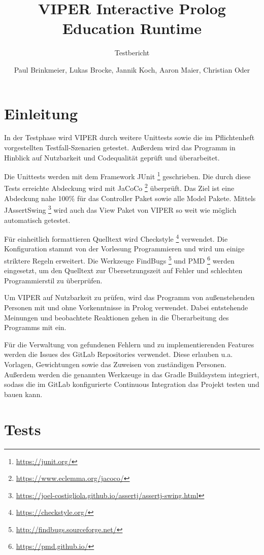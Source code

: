 \documentclass[parskip=full,11pt,twoside]{scrartcl}
\title{VIPER Interactive Prolog Education Runtime}
\subtitle{Testbericht}
\author{Paul Brinkmeier, Lukas Brocke, Jannik Koch, Aaron Maier, Christian Oder}
\date{}
\begin{document}
\maketitle

\tableofcontents

\section{Einleitung}
\setcounter{page}{1}

In der Testphase wird VIPER durch weitere Unittests sowie die im Pflichtenheft vorgestellten Testfall-Szenarien getestet. Außerdem wird das Programm in Hinblick auf Nutzbarkeit und Codequalität geprüft und überarbeitet.

Die Unittests werden mit dem Framework JUnit \footnote{\url{https://junit.org/}} geschrieben. Die durch diese Tests erreichte Abdeckung wird mit JaCoCo \footnote{\url{https://www.eclemma.org/jacoco/}} überprüft. Das Ziel ist eine Abdeckung nahe 100\% für das Controller Paket sowie alle Model Pakete. Mittels JAssertSwing \footnote{\url{https://joel-costigliola.github.io/assertj/assertj-swing.html}} wird auch das View Paket von VIPER so weit wie möglich automatisch getestet.

Für einheitlich formattieren Quelltext wird Checkstyle \footnote{\url{https://checkstyle.org/}} verwendet. Die Konfiguration stammt von der Vorlesung Programmieren und wird um einige striktere Regeln erweitert. Die Werkzeuge FindBugs \footnote{\url{http://findbugs.sourceforge.net/}} und PMD \footnote{\url{https://pmd.github.io/}} werden eingesetzt, um den Quelltext zur Übersetzungszeit auf Fehler und schlechten Programmierstil zu überprüfen.

Um VIPER auf Nutzbarkeit zu prüfen, wird das Programm von außenstehenden Personen mit und ohne Vorkenntnisse in Prolog verwendet. Dabei entstehende Meinungen und beobachtete Reaktionen gehen in die Überarbeitung des Programms mit ein.

Für die Verwaltung von gefundenen Fehlern und zu implementierenden Features werden die Issues des GitLab Repositories verwendet. Diese erlauben u.a. Vorlagen, Gewichtungen sowie das Zuweisen von zuständigen Personen. Außerdem werden die genannten Werkzeuge in das Gradle Buildsystem integriert, sodass die im GitLab konfigurierte Continuous Integration das Projekt testen und bauen kann.

\section{Tests}
\end{document}
